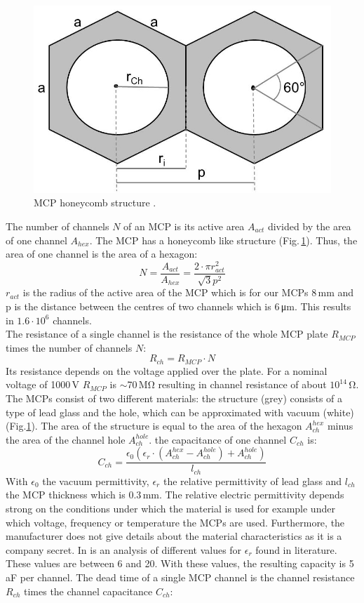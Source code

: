 		\begin{figure}[h]
			\centering
			\includegraphics[width=.4\textwidth]{Bilder/MCP_hex.jpg}
			\caption{MCP honeycomb structure \cite{Diss_Neuland}.}
			\label{fig:MCPhex} %
		\end{figure}
		The number of channels $N$ of an MCP is its active area $A_{act}$ divided by the area of one channel $A_{hex}$. The MCP has a honeycomb like structure (Fig.\,\ref{fig:MCPhex}). Thus, the area of one channel is the area of a hexagon:
		\begin{equation}
			N = \frac{A_{act}}{A_{hex}} = \frac{2\cdot\pi r^2_{act}}{\sqrt{3}p^2}
		\end{equation}
		$r_{act}$ is the radius of the active area of the MCP which is for our MCPs 8\,\si{\milli\meter} and p is the distance between the centres of two channels which is 6\,\si{\micro\meter}. This results in $1.6\cdot10^6$ channels.\\
		The resistance of a single channel is the resistance of the whole MCP plate $R_{MCP}$ times the number of channels $N$:
		\begin{equation}
			R_{ch} = R_{MCP}\cdot N
		\end{equation}
		Its resistance depends on the voltage applied over the plate. For a nominal voltage of 1000\,\si{\volt} $R_{MCP}$ is $\sim$70\,\si{\mega\ohm} resulting in channel resistance of about $10^{14}$\,\si{\ohm}.\\
		The MCPs consist of two different materials: the structure (grey) consists of a type of lead glass and the hole, which can be approximated with vacuum (white) (Fig.\ref{fig:MCPhex}). The area of the structure is equal to the area of the hexagon $A^{hex}_{ch}$ minus the area of the channel hole $A^{hole}_{ch}$. the capacitance of one channel $C_{ch}$ is:
		\begin{equation}
			C_{ch} = \frac{\epsilon_0  (\epsilon_r \cdot (A^{hex}_{ch} - A^{hole}_{ch})+ A^{hole}_{ch})}{l_{ch}}
		\end{equation}
		With $\epsilon_0$ the vacuum permittivity, $\epsilon_r$ the relative permittivity of lead glass and $l_{ch}$ the MCP thickness which is 0.3\,\si{\milli\meter}. The relative electric permittivity depends strong on the conditions under which the material is used for example under which voltage, frequency or temperature the MCPs are used. Furthermore, the manufacturer does not give details about the material characteristics as it is a company secret. In \cite{Diss_Neuland} is an analysis of different values for $\epsilon_r$ found in literature. These values are between 6 and 20. With these values, the resulting capacity is 5\,\si{\atto\farad} per channel. The dead time of a single MCP channel is the channel resistance $R_{ch}$ times the channel capacitance $C_{ch}$:
